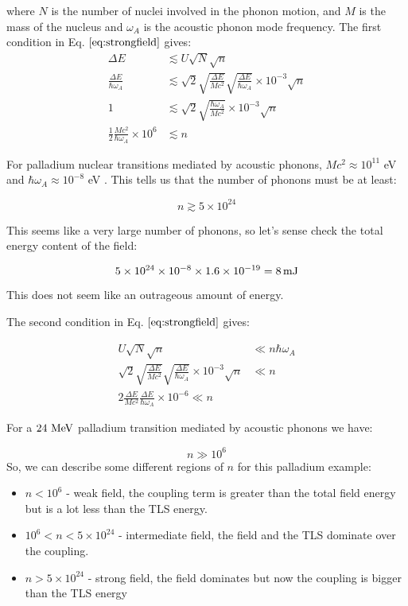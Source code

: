 \documentclass[
]{article}
\renewcommand{\[}{\begin{equation}}
\renewcommand{\]}{\end{equation}}
\providecommand{\tightlist}{%
  \setlength{\itemsep}{0pt}\setlength{\parskip}{0pt}}
\begin{document}
where \(N\) is the number of nuclei involved in the phonon motion, and
\(M\) is the mass of the nucleus and \(\omega_A\) is the acoustic phonon
mode frequency. The first condition in Eq. \(\ref{eq:strongfield}\)
gives: \[
\begin{aligned}
\Delta E &\lesssim U\sqrt{N}\sqrt{n} \\
\frac{\Delta E}{\hbar \omega_A} &\lesssim \sqrt{2} \sqrt{\frac{\Delta E}{M c^2}} \sqrt{\frac{\Delta E}{\hbar \omega_A}} \times 10^{-3}\sqrt{n} \\
1 &\lesssim \sqrt{2} \sqrt{\frac{\hbar\omega_A}{M c^2}} \times 10^{-3}\sqrt{n} \\
\frac{1}{2}\frac{Mc^2}{\hbar\omega_A}\times 10^6 &\lesssim n
\end{aligned}
\]

For palladium nuclear transitions mediated by acoustic phonons,
\(M c^2 \approx 10^{11}\) eV and \(\hbar \omega_A \approx 10^{-8}\) eV .
This tells us that the number of phonons must be at least:

\[
n \gtrsim 5\times 10^{24}
\]

This seems like a very large number of phonons, so let's sense check the
total energy content of the field:

\[
5\times 10^{24} \times 10^{-8} \times 1.6\times 10^{-19} = 8 \, \rm mJ
\]

This does not seem like an outrageous amount of energy.

The second condition in Eq. \(\ref{eq:strongfield}\) gives:

\[
\begin{aligned}
U\sqrt{N}\sqrt{n} &\ll  n\hbar \omega_A \\
\sqrt{2} \sqrt{\frac{\Delta E}{M c^2}} \sqrt{\frac{\Delta E}{\hbar \omega_A}} \times 10^{-3}\sqrt{n} &\ll n \\
2\frac{\Delta E}{M c^2} \frac{\Delta E}{\hbar \omega_A} \times 10^{-6} \ll n
\end{aligned}
\]

For a \(\rm 24 \ MeV\) palladium transition mediated by acoustic phonons
we have:

\[
n \gg 10^{6}
\] So, we can describe some different regions of \(n\) for this
palladium example:

\begin{itemize}
\tightlist
\item
  \(n<10^{6}\) - weak field, the coupling term is greater than the total
  field energy but is a lot less than the TLS energy.
\item
  \(10^6 < n < 5 \times 10^{24}\) - intermediate field, the field and
  the TLS dominate over the coupling.
\item
  \(n > 5\times 10^{24}\) - strong field, the field dominates but now
  the coupling is bigger than the TLS energy
\end{itemize}
\end{document}
